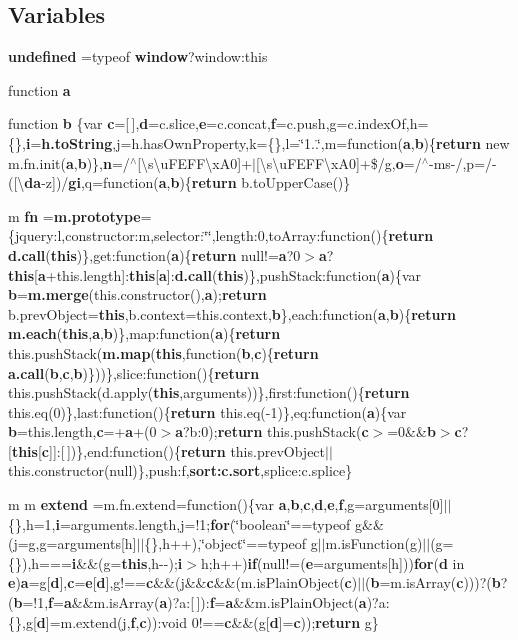 \subsection*{Variables}
\begin{DoxyCompactItemize}
\item 
{\bf undefined} =typeof {\bf window}?window\+:this
\item 
function {\bf a}
\item 
function {\bf b} \{var {\bf c}=[$\,$],{\bf d}=c.\+slice,{\bf e}=c.\+concat,{\bf f}=c.\+push,g=c.\+index\+Of,h=\{\},{\bf i}={\bf h.\+to\+String},j=h.\+has\+Own\+Property,k=\{\},l=\char`\"{}1..\char`\"{},m=function({\bf a},{\bf b})\{{\bf return} new m.\+fn.\+init({\bf a},{\bf b})\},{\bf n}=/$^\wedge$[\textbackslash{}s\textbackslash{}u\+F\+E\+F\+F\textbackslash{}x\+A0]+$\vert$[\textbackslash{}s\textbackslash{}u\+F\+E\+F\+F\textbackslash{}x\+A0]+\$/g,{\bf o}=/$^\wedge$-\/ms-\//,p=/-\/([\textbackslash{}{\bf da}-\/z])/{\bf gi},q=function({\bf a},{\bf b})\{{\bf return} b.\+to\+Upper\+Case()\}
\item 
m {\bf fn} ={\bf m.\+prototype}=\{jquery\+:l,constructor\+:m,selector\+:\char`\"{}\char`\"{},length\+:0,to\+Array\+:function()\{{\bf return} {\bf d.\+call}({\bf this})\},get\+:function({\bf a})\{{\bf return} null!={\bf a}?0$>${\bf a}?{\bf this}[{\bf a}+this.\+length]\+:{\bf this}[{\bf a}]\+:{\bf d.\+call}({\bf this})\},push\+Stack\+:function({\bf a})\{var {\bf b}={\bf m.\+merge}(this.\+constructor(),{\bf a});{\bf return} b.\+prev\+Object={\bf this},b.\+context=this.\+context,{\bf b}\},each\+:function({\bf a},{\bf b})\{{\bf return} {\bf m.\+each}({\bf this},{\bf a},{\bf b})\},map\+:function({\bf a})\{{\bf return} this.\+push\+Stack({\bf m.\+map}({\bf this},function({\bf b},{\bf c})\{{\bf return} {\bf a.\+call}({\bf b},{\bf c},{\bf b})\}))\},slice\+:function()\{{\bf return} this.\+push\+Stack(d.\+apply({\bf this},arguments))\},first\+:function()\{{\bf return} this.\+eq(0)\},last\+:function()\{{\bf return} this.\+eq(-\/1)\},eq\+:function({\bf a})\{var {\bf b}=this.\+length,{\bf c}=+{\bf a}+(0$>${\bf a}?b\+:0);{\bf return} this.\+push\+Stack({\bf c}$>$=0\&\&{\bf b}$>${\bf c}?[{\bf this}[{\bf c}]]\+:[$\,$])\},end\+:function()\{{\bf return} this.\+prev\+Object$\vert$$\vert$this.\+constructor(null)\},push\+:f,{\bf sort\+:c.\+sort},splice\+:c.\+splice\}
\item 
m m {\bf extend} =m.\+fn.\+extend=function()\{var {\bf a},{\bf b},{\bf c},{\bf d},{\bf e},{\bf f},g=arguments[0]$\vert$$\vert$\{\},h=1,{\bf i}=arguments.\+length,j=!1;{\bf for}(\char`\"{}boolean\char`\"{}==typeof g\&\&(j=g,g=arguments[h]$\vert$$\vert$\{\},h++),\char`\"{}object\char`\"{}==typeof g$\vert$$\vert$m.\+is\+Function(g)$\vert$$\vert$(g=\{\}),h==={\bf i}\&\&(g={\bf this},h-\/-\/);{\bf i}$>$h;h++){\bf if}(null!=({\bf e}=arguments[h])){\bf for}({\bf d} in {\bf e}){\bf a}=g[{\bf d}],{\bf c}={\bf e}[{\bf d}],g!=={\bf c}\&\&(j\&\&{\bf c}\&\&(m.\+is\+Plain\+Object({\bf c})$\vert$$\vert$({\bf b}=m.\+is\+Array({\bf c})))?({\bf b}?({\bf b}=!1,{\bf f}={\bf a}\&\&m.\+is\+Array({\bf a})?a\+:[$\,$])\+:{\bf f}={\bf a}\&\&m.\+is\+Plain\+Object({\bf a})?a\+:\{\},g[{\bf d}]=m.\+extend(j,{\bf f},{\bf c}))\+:void 0!=={\bf c}\&\&(g[{\bf d}]={\bf c}));{\bf return} g\}
\end{DoxyCompactItemize}


